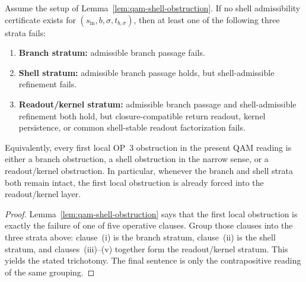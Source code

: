 \begin{lemma}\label{lem:qam-shell-obstruction-stratification}
Assume the setup of Lemma~\ref{lem:qam-shell-obstruction}. If no shell admissibility certificate exists for $(s_{\mathrm{in}},b,\sigma,t_{b,\sigma})$, then at least one of the following three strata fails:
\begin{enumerate}[leftmargin=2em,label=(\arabic*)]
  \item \textbf{Branch stratum:} admissible branch passage fails.
  \item \textbf{Shell stratum:} admissible branch passage holds, but shell-admissible refinement fails.
  \item \textbf{Readout/kernel stratum:} admissible branch passage and shell-admissible refinement both hold, but closure-compatible return readout, kernel persistence, or common shell-stable readout factorization fails.
\end{enumerate}
Equivalently, every first local OP~3 obstruction in the present QAM reading is either a branch obstruction, a shell obstruction in the narrow sense, or a readout/kernel obstruction. In particular, whenever the branch and shell strata both remain intact, the first local obstruction is already forced into the readout/kernel layer.
\end{lemma}

\begin{proof}
Lemma~\ref{lem:qam-shell-obstruction} says that the first local obstruction is exactly the failure of one of five operative clauses. Group those clauses into the three strata above: clause~(i) is the branch stratum, clause~(ii) is the shell stratum, and clauses~(iii)--(v) together form the readout/kernel stratum. This yields the stated trichotomy. The final sentence is only the contrapositive reading of the same grouping.
\end{proof}

